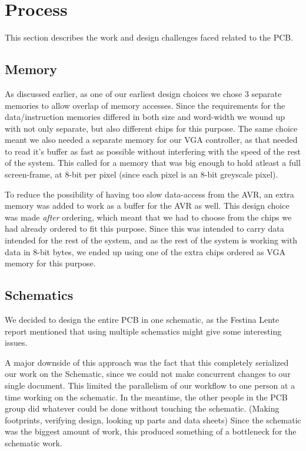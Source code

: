 \section {Process}
This section describes the work and design challenges faced related to the PCB.
\subsection{Memory}
As discussed earlier, as one of our earliest design choices we chose 3 separate memories to allow overlap of
memory accesses. Since the requirements for the data/instruction memories differed in both size and word-width 
we wound up with not only separate, but also different chips for this purpose. The same choice meant we also
needed a separate memory for our \ac{VGA} controller, as that needed to read it's buffer as fast as possible
without interfering with the speed of the rest of the system. This called for a memory that was big enough to
hold atleast a full screen-frame, at 8-bit per pixel (since each pixel is an 8-bit greyscale pixel).

To reduce the possibility of having too slow data-access from the AVR, an extra memory was added to work as
a buffer for the AVR as well. This design choice was made {\em after} ordering, which meant that we had to choose from
the chips we had already ordered to fit this purpose. Since this was intended to carry data intended for the rest
of the system, and as the rest of the system is working with data in 8-bit bytes, we ended up using one of the
extra chips ordered as \ac{VGA} memory for this purpose.

\subsection {Schematics}

We decided to design the entire \ac{PCB} in one schematic, as the Festina Lente
report mentioned that using multiple schematics might give
some interesting issues.

A major downside of this approach was the fact that this completely serialized
our work on the Schematic, since we could not make concurrent changes to our
single document. This limited the parallelism of our workflow to one person at a
time working on the schematic.  In the meantime, the other people in the
\ac{PCB} group did whatever could be done without touching the
schematic. (Making footprints, verifying design, looking up parts and data
sheets) Since the schematic was the biggest amount of work, this produced
something of a bottleneck for the schematic work.

